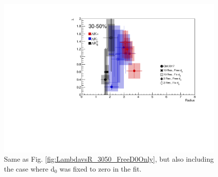 \documentclass[../AnalysisNoteJBuxton.tex]{subfiles}
\begin{document}
\begin{figure}[h]
  \centering
  \includegraphics[width=\textwidth]{7_ResultsAndDiscussion/Figures/CompareAllRadiusvsLambdaAcrossAnalyses_3050_10ResAnd3Res_10and3SeparateOnly_FreeAndFixedD0.pdf}
  \caption[$\lambda$ vs. R (30-50\% Centrality) (free and fixed d$_{0}$)]{Same as Fig. \ref{fig:LambdavsR_3050_FreeD0Only}, but also including the case where d$_{0}$ was fixed to zero in the fit.}
  \label{fig:LambdavsR_3050_FreeAndFixedD0}
\end{figure}














\end{document}
